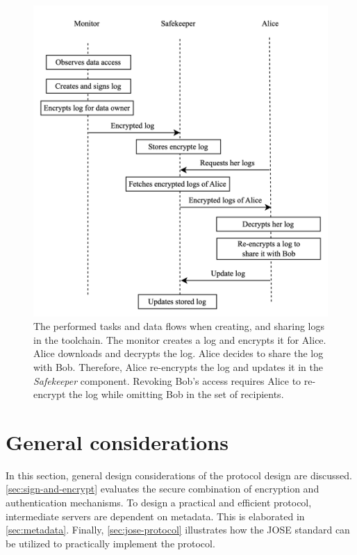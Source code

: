 \documentclass[../main.tex]{subfiles}
\begin{document}
\begin{figure}[h!]
    \includegraphics[width=12.7cm]{../img/05/overview.png}
    \centering
    \caption[Protocol overview]{
        The performed tasks and data flows when creating, and sharing logs in the toolchain.
        The monitor creates a log and encrypts it for Alice.
        Alice downloads and decrypts the log.
        Alice decides to share the log with Bob.
        Therefore, Alice re-encrypts the log and updates it in the \emph{Safekeeper} component.
        Revoking Bob's access requires Alice to re-encrypt the log while omitting Bob in the set of recipients.
    }
    \label{fig:protocol-overview}
\end{figure}

\section{General considerations}
\label{sec:protocol-considerations}
In this section, general design considerations of the protocol design are discussed.
\cref{sec:sign-and-encrypt} evaluates the secure combination of encryption and authentication mechanisms.
To design a practical and efficient protocol, intermediate servers are dependent on metadata.
This is elaborated in \cref{sec:metadata}.
Finally, \cref{sec:jose-protocol} illustrates how the JOSE standard can be utilized to practically implement the protocol.
\end{document}
